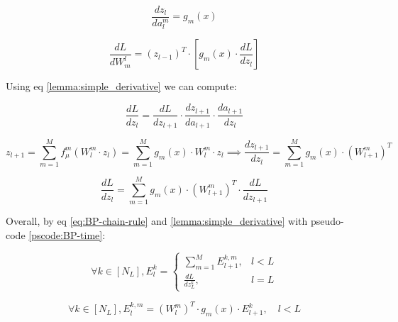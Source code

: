 \begin{equation}
    \frac{dz_l}{da_l^m} = g_m(x)
\end{equation}

\begin{equation}
    \frac{dL}{dW_m^l} = (z_{l-1})^T \cdot [g_m(x) \cdot \frac{dL}{dz_l}]
\end{equation}

Using eq \ref{lemma:simple_derivative} we can compute:

\begin{equation}
    \frac{dL}{dz_l} = \frac{dL}{dz_{l+1}} \cdot \frac{dz_{l+1}}{da_{l+1}} \cdot \frac{da_{l+1}}{dz_l}
\end{equation}

\begin{equation}
    z_{l+1} = \sum_{m=1}^M f_\mu^m (W_l^m \cdot z_l) = \sum_{m=1}^M g_m(x) \cdot W_l^m \cdot z_l \implies \frac{dz_{l+1}}{dz_l} = \sum_{m=1}^M g_m(x) \cdot (W_{l+1}^m)^T
\end{equation}

\begin{equation}
    \frac{dL}{dz_l} = \sum_{m=1}^M g_m(x) \cdot (W_{l+1}^m)^T \cdot \frac{dL}{dz_{l+1}}
\end{equation}

Overall, by eq \ref{eq:BP-chain-rule} and \ref{lemma:simple_derivative} with pseudo-code \ref{pscode:BP-time}:

\begin{equation}
    \forall k \in [N_L], E_l^k = \begin{cases} \sum_{m=1}^M E_{l+1}^{k,m}, & l < L \\ \frac{dL}{dz_L^k}, & l = L \end{cases}
\end{equation}

\begin{equation}
    \forall k \in [N_L], E_l^{k,m} = (W_l^m)^T \cdot g_m(x) \cdot E_{l+1}^k, \quad l < L
\end{equation}


